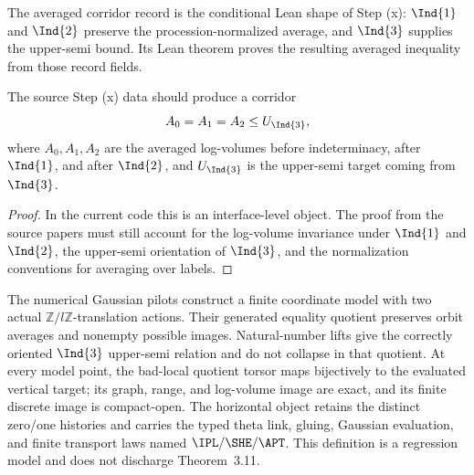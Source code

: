 \begin{definition}
  \label{def:step-x-averaged-corridor-record}
  \leanok
  The averaged corridor record is the conditional Lean shape of Step (x):
  \(\Ind{1}\) and \(\Ind{2}\) preserve the procession-normalized average, and
  \(\Ind{3}\) supplies the upper-semi bound.  Its Lean theorem proves the
  resulting averaged inequality from those record fields.
\end{definition}

\begin{proposition}
  \label{prop:step-x-corridor}
  \notready
  The source Step (x) data should produce a corridor
  \[
    A_0 = A_1 = A_2 \le U_{\Ind{3}},
  \]
  where \(A_0,A_1,A_2\) are the averaged log-volumes before
  indeterminacy, after \(\Ind{1}\), and after \(\Ind{2}\), and
  \(U_{\Ind{3}}\) is the upper-semi target coming from \(\Ind{3}\).
\end{proposition}

\begin{proof}
  In the current code this is an interface-level object.  The proof from the
  source papers must still account for the log-volume invariance under
  \(\Ind{1}\) and \(\Ind{2}\), the upper-semi orientation of \(\Ind{3}\), and
  the normalization conventions for averaging over labels.
\end{proof}

\begin{definition}
  \label{def:constructed-m3-procession}
  \leanok
  The numerical Gaussian pilots construct a finite coordinate model with two
  actual \(\mathbb Z/l\mathbb Z\)-translation actions.  Their generated
  equality quotient preserves orbit averages and nonempty possible images.
  Natural-number lifts give the correctly oriented \(\Ind{3}\) upper-semi
  relation and do not collapse in that quotient. At every model point,
  the bad-local quotient torsor maps bijectively to the evaluated vertical
  target; its graph, range, and log-volume image are exact, and its finite
  discrete image is compact-open.  The horizontal object retains the distinct
  zero/one histories and carries the typed theta link, gluing, Gaussian
  evaluation, and finite transport laws named \(\IPL/\SHE/\APT\). This
  definition is a regression model and does not discharge Theorem~3.11.
\end{definition}

